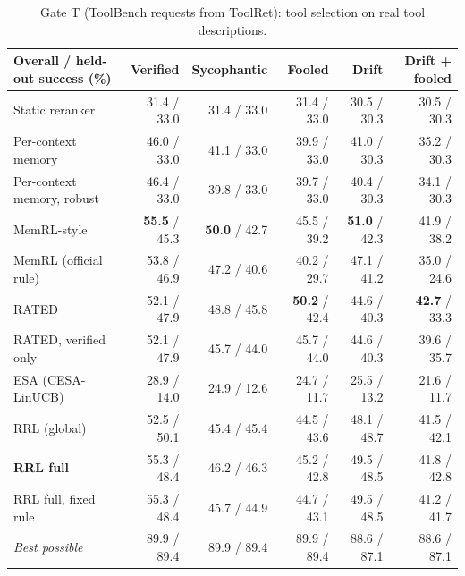 \begin{table}[t]
\centering
\small
\setlength{\tabcolsep}{3.5pt}
\begin{tabular}{lrrrrr}
\toprule
Overall / held-out success (\%) & Verified & Sycophantic & Fooled & Drift & Drift + fooled \\
\midrule
Static reranker & 31.4 / 33.0 & 31.4 / 33.0 & 31.4 / 33.0 & 30.5 / 30.3 & 30.5 / 30.3 \\
Per-context memory & 46.0 / 33.0 & 41.1 / 33.0 & 39.9 / 33.0 & 41.0 / 30.3 & 35.2 / 30.3 \\
Per-context memory, robust & 46.4 / 33.0 & 39.8 / 33.0 & 39.7 / 33.0 & 40.4 / 30.3 & 34.1 / 30.3 \\
MemRL-style & \textbf{55.5} / 45.3 & \textbf{50.0} / 42.7 & 45.5 / 39.2 & \textbf{51.0} / 42.3 & 41.9 / 38.2 \\
MemRL (official rule) & 53.8 / 46.9 & 47.2 / 40.6 & 40.2 / 29.7 & 47.1 / 41.2 & 35.0 / 24.6 \\
RATED & 52.1 / 47.9 & 48.8 / 45.8 & \textbf{50.2} / 42.4 & 44.6 / 40.3 & \textbf{42.7} / 33.3 \\
RATED, verified only & 52.1 / 47.9 & 45.7 / 44.0 & 45.7 / 44.0 & 44.6 / 40.3 & 39.6 / 35.7 \\
ESA (CESA-LinUCB) & 28.9 / 14.0 & 24.9 / 12.6 & 24.7 / 11.7 & 25.5 / 13.2 & 21.6 / 11.7 \\
\midrule
RRL (global) & 52.5 / 50.1 & 45.4 / 45.4 & 44.5 / 43.6 & 48.1 / 48.7 & 41.5 / 42.1 \\
\textbf{RRL full} & 55.3 / 48.4 & 46.2 / 46.3 & 45.2 / 42.8 & 49.5 / 48.5 & 41.8 / 42.8 \\
RRL full, fixed rule & 55.3 / 48.4 & 45.7 / 44.9 & 44.7 / 43.1 & 49.5 / 48.5 & 41.2 / 41.7 \\
\textit{Best possible} & 89.9 / 89.4 & 89.9 / 89.4 & 89.9 / 89.4 & 88.6 / 87.1 & 88.6 / 87.1 \\
\bottomrule
\end{tabular}
\caption{Gate T (ToolBench requests from ToolRet): tool selection on real tool descriptions.}
\label{tab:gatet}
\end{table}
